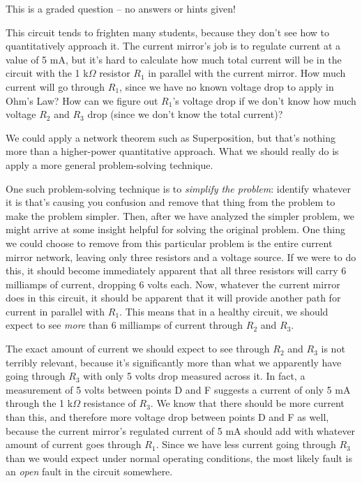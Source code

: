 
This is a graded question -- no answers or hints given!







This circuit tends to frighten many students, because they don't see how to quantitatively approach it.  The current mirror's job is to regulate current at a value of 5 mA, but it's hard to calculate how much total current will be in the circuit with the 1 k$\Omega$ resistor $R_1$ in parallel with the current mirror.  How much current will go through $R_1$, since we have no known voltage drop to apply in Ohm's Law?  How can we figure out $R_1$'s voltage drop if we don't know how much voltage $R_2$ and $R_3$ drop (since we don't know the total current)?

We could apply a network theorem such as Superposition, but that's nothing more than a higher-power quantitative approach.  What we should really do is apply a more general problem-solving technique.

\vskip 10pt

One such problem-solving technique is to {\it simplify the problem}: identify whatever it is that's causing you confusion and remove that thing from the problem to make the problem simpler.  Then, after we have analyzed the simpler problem, we might arrive at some insight helpful for solving the original problem.  One thing we could choose to remove from this particular problem is the entire current mirror network, leaving only three resistors and a voltage source.  If we were to do this, it should become immediately apparent that all three resistors will carry 6 milliamps of current, dropping 6 volts each.  Now, whatever the current mirror does in this circuit, it should be apparent that it will provide another path for current in parallel with $R_1$.  This means that in a healthy circuit, we should expect to see {\it more} than 6 milliamps of current through $R_2$ and $R_3$.

The exact amount of current we should expect to see through $R_2$ and $R_3$ is not terribly relevant, because it's significantly more than what we apparently have going through $R_3$ with only 5 volts drop measured across it.  In fact, a measurement of 5 volts between points D and F suggests a current of only 5 mA through the 1 k$\Omega$ resistance of $R_3$.  We know that there should be more current than this, and therefore more voltage drop between points D and F as well, because the current mirror's regulated current of 5 mA should add with whatever amount of current goes through $R_1$.  Since we have less current going through $R_3$ than we would expect under normal operating conditions, the most likely fault is an {\it open} fault in the circuit somewhere.


